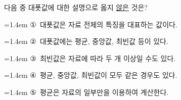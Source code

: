 다음 중 대푯값에 대한 설명으로 옳지 \underline{않은} 것은?
\par\medskip\par\noindent\hangindent=1.4em {\small ①}\ 대푯값은 자료 전체의 특징을 대표하는 값이다.\par\noindent\hangindent=1.4em {\small ②}\ 대푯값에는 평균, 중앙값, 최빈값 등이 있다.\par\noindent\hangindent=1.4em {\small ③}\ 최빈값은 자료에 따라 두 개 이상일 수도 있다.\par\noindent\hangindent=1.4em {\small ④}\ 평균, 중앙값, 최빈값이 모두 같은 경우도 있다.\par\noindent\hangindent=1.4em {\small ⑤}\ 평균은 자료의 일부만을 이용하여 계산한다.\par\medskip
